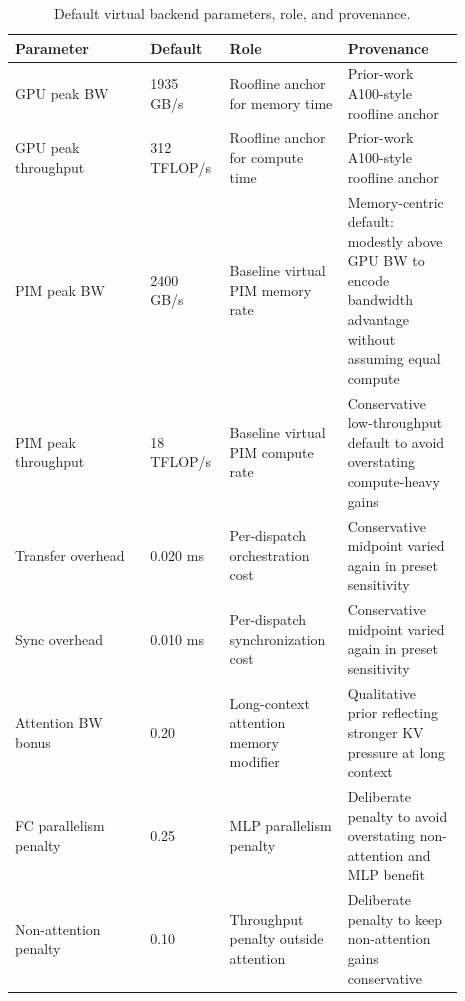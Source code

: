 \begin{table}[t]
\centering
\caption{Default virtual backend parameters, role, and provenance.}
\label{tab:backend-params}
\begin{tabular}{p{0.28\linewidth}p{0.13\linewidth}p{0.24\linewidth}p{0.24\linewidth}}
\toprule
Parameter & Default & Role & Provenance \\
\midrule
GPU peak BW & 1935 GB/s & Roofline anchor for memory time & Prior-work A100-style roofline anchor \\
GPU peak throughput & 312 TFLOP/s & Roofline anchor for compute time & Prior-work A100-style roofline anchor \\
PIM peak BW & 2400 GB/s & Baseline virtual PIM memory rate & Memory-centric default: modestly above GPU BW to encode bandwidth advantage without assuming equal compute \\
PIM peak throughput & 18 TFLOP/s & Baseline virtual PIM compute rate & Conservative low-throughput default to avoid overstating compute-heavy gains \\
Transfer overhead & 0.020 ms & Per-dispatch orchestration cost & Conservative midpoint varied again in preset sensitivity \\
Sync overhead & 0.010 ms & Per-dispatch synchronization cost & Conservative midpoint varied again in preset sensitivity \\
Attention BW bonus & 0.20 & Long-context attention memory modifier & Qualitative prior reflecting stronger KV pressure at long context \\
FC parallelism penalty & 0.25 & MLP parallelism penalty & Deliberate penalty to avoid overstating non-attention and MLP benefit \\
Non-attention penalty & 0.10 & Throughput penalty outside attention & Deliberate penalty to keep non-attention gains conservative \\
\bottomrule
\end{tabular}
\end{table}
